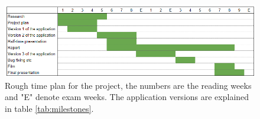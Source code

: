 \begin{figure}[h]
    \centering
    \includegraphics[scale=0.7]{assets/timePlan.PNG}
    \caption{Rough time plan for the project, the numbers are the reading weeks and "E" denote exam weeks. The application versions are explained in table \ref{tab:milestones}.}
    \label{fig:timeplan}
\end{figure}
